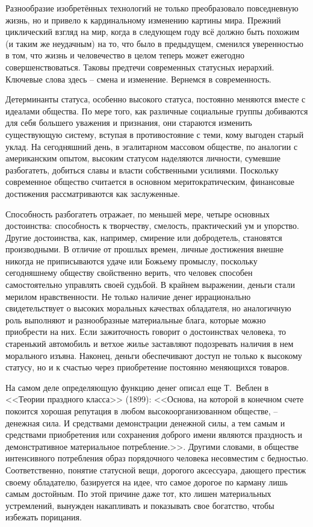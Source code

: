 Разнообразие изобретённых технологий не только преобразовало повседневную жизнь,
но и привело к кардинальному изменению картины мира. Прежний циклический взгляд
на мир, когда в следующем году всё должно быть похожим (и таким же неудачным)
на то, что было в предыдущем, сменился уверенностью в том, что жизнь и
человечество в целом теперь может ежегодно совершенствоваться. Таковы предтечи
современных статусных иерархий. Ключевые слова здесь -- смена и изменение.
Вернемся в современность.

Детерминанты статуса, особенно высокого статуса, постоянно меняются вместе с
идеалами общества. По мере того, как различные социальные группы добиваются для
себя большего уважения и признания, они стараются изменить существующую систему,
вступая в противостояние с теми, кому выгоден старый уклад. На сегодняшний день,
в эгалитарном массовом обществе, по аналогии с американским опытом, высоким
статусом  наделяются личности, сумевшие разбогатеть, добиться славы и власти
собственными усилиями. Поскольку современное общество считается в основном
меритократическим, финансовые достижения рассматриваются как заслуженные.

Способность разбогатеть отражает, по меньшей мере, четыре основных достоинства:
способность к творчеству, смелость, практический ум и упорство. Другие
достоинства, как, например, смирение или добродетель, становятся производными.
В отличие от прошлых времен, личные достижения внешне никогда не приписываются
удаче или Божьему промыслу, поскольку сегодняшнему обществу свойственно верить,
что человек способен самостоятельно управлять своей судьбой. В крайнем выражении,
деньги стали мерилом нравственности. Не только наличие денег иррационально
свидетельствует о высоких моральных качествах обладателя, но аналогичную роль
выполняют и разнообразные материальные блага, которые можно приобрести на них.
Если зажиточность говорит о достоинствах человека, то старенький автомобиль и
ветхое жилье заставляют подозревать наличия в нем морального изъяна. Наконец,
деньги обеспечивают доступ не только к высокому статусу, но и к счастью через
приобретение постоянно меняющихся товаров.

На самом деле определяющую функцию денег описал еще Т.~Веблен в <<Теории
праздного класса>> (1899): <<Основа, на которой в конечном счете покоится
хорошая репутация в любом высокоорганизованном обществе, -- денежная сила.
И средствами демонстрации денежной силы, а тем самым и средствами приобретения
или сохранения доброго имени являются праздность и демонстративное материальное
потребление.>>\autocite[][120]{veblen1984teoria}.  Другими словами, в обществе
интенсивного потребления образ порядочного человека несовместим с бедностью.
Соответственно, понятие статусной вещи, дорогого аксессуара, дающего престиж
своему обладателю, базируется на идее, что самое дорогое по карману лишь самым
достойным. По этой причине даже тот, кто лишен материальных устремлений, вынужден
накапливать и показывать свое богатство, чтобы избежать порицания.

